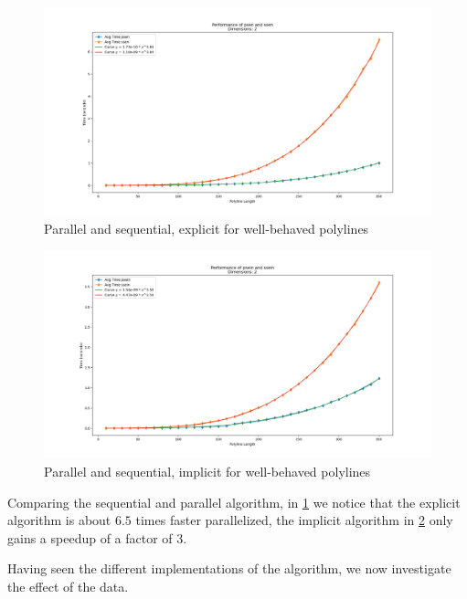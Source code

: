 \begin{figure}[ht]
  \centering
  \includegraphics[scale=0.5, width=\linewidth]{figures/psen-ssen.png}
  \caption{Parallel and sequential, explicit for well-behaved polylines}
  \label{fig:psen-ssen}
\end{figure}

\begin{figure}[ht]
  \centering
  \includegraphics[scale=0.5, width=\linewidth]{figures/psein-ssein.png}
  \caption{Parallel and sequential, implicit for well-behaved polylines}
  \label{fig:psein-ssein}
\end{figure}

Comparing the sequential and parallel algorithm, in \cref{fig:psen-ssen} we notice that the explicit algorithm is about \(6.5\) times faster parallelized, the implicit algorithm in \cref{fig:psein-ssein} only gains a speedup of a factor of \(3\). 

Having seen the different implementations of the algorithm, we now investigate the effect of the data.

